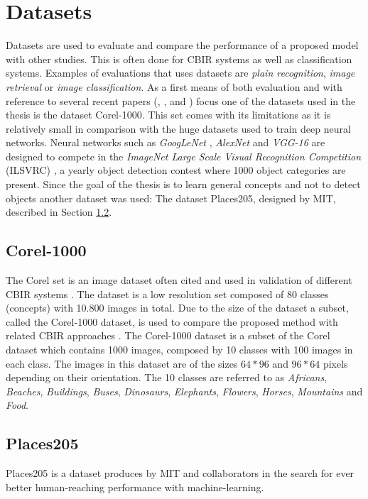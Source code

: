 \section{Datasets}
\label{sec:theory:datasets}
Datasets are used to evaluate and compare the performance of a proposed model with other studies. This is often done for CBIR systems as well as classification systems.
Examples of evaluations that uses datasets are \emph{plain recognition}, \emph{image retrieval} or \emph{image classification}. 
As a first means of both evaluation and with reference to several recent papers (\cite{wang2001simplicity}, \cite{subrahmanyam2013modified}, \cite{nagaraja2015low} and \cite{elalami2014new}) focus one of the datasets used in the thesis is the dataset Corel-1000. 
This set comes with its limitations as it is relatively small in comparison with the huge datasets used to train deep neural networks. Neural networks such as \emph{GoogLeNet} \cite{szegedy2015going}, \emph{AlexNet} \cite{krizhevsky2012imagenet} and \emph{VGG-16} \cite{simonyan2014very} are designed to compete in the \emph{ImageNet Large Scale Visual Recognition Competition} (ILSVRC) \cite{russakovsky2015imagenet}, a yearly object detection contest where 1000 object categories are present. Since the goal of the thesis is to learn general concepts and not to detect objects another dataset was used: The dataset Places205, designed by MIT, described in Section \ref{sec:theory:dataset:places}.   


\subsection{Corel-1000}
\label{sec:corel}
The Corel set is an image dataset often cited and used in validation of different CBIR systems \cite{coreldataset2017}. The dataset is a low resolution set composed of 80 classes (concepts) with 10.800 images in total. Due to the size of the dataset a subset, called the Corel-1000 dataset, is used to compare the proposed method with related CBIR approaches \cite{wang2001simplicity}. The Corel-1000 dataset is a subset of the Corel dataset which contains 1000 images, composed by 10 classes with 100 images in each class. The images in this dataset are of the sizes $64*96$ and $96*64$ pixels depending on their orientation. The 10 classes are referred to as \emph{Africans}, \emph{Beaches}, \emph{Buildings}, \emph{Buses}, \emph{Dinosaurs}, \emph{Elephants}, \emph{Flowers}, \emph{Horses}, \emph{Mountains} and \emph{Food}. 

\subsection{Places205}
\label{sec:theory:dataset:places}
Places205 is a dataset produces by MIT and collaborators in the search for ever better human-reaching performance with machine-learning. 

